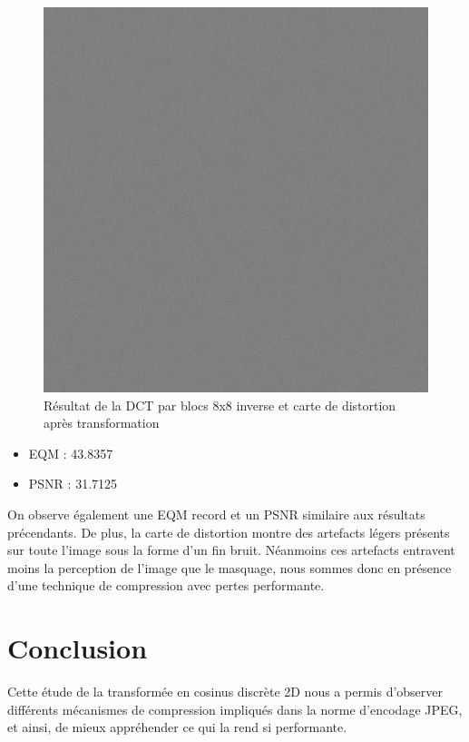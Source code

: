 \documentclass[12pt]{report}
\begin{document}
\begin{figure}[H]
\begin{center}
\includegraphics[scale=0.4]{../ImageRes/blockidct_transform_disto.jpg} 
\caption{Résultat de la DCT par blocs 8x8 inverse et carte de distortion après transformation}
\end{center}
\end{figure}

\begin{itemize}
\item EQM : 43.8357
\item PSNR : 31.7125\\
\end{itemize}

On observe également une EQM record et un PSNR similaire aux résultats précendants. De plus, la carte de distortion montre des artefacts légers présents sur toute l'image sous la forme d'un fin bruit. Néanmoins ces artefacts entravent moins la perception de l'image que le masquage, nous sommes donc en présence d'une technique de compression avec pertes performante.

\section{Conclusion}

Cette étude de la transformée en cosinus discrète 2D nous a permis d'observer différents mécanismes de compression impliqués dans la norme d'encodage JPEG, et ainsi, de mieux appréhender ce qui la rend si performante.
\end{document}
